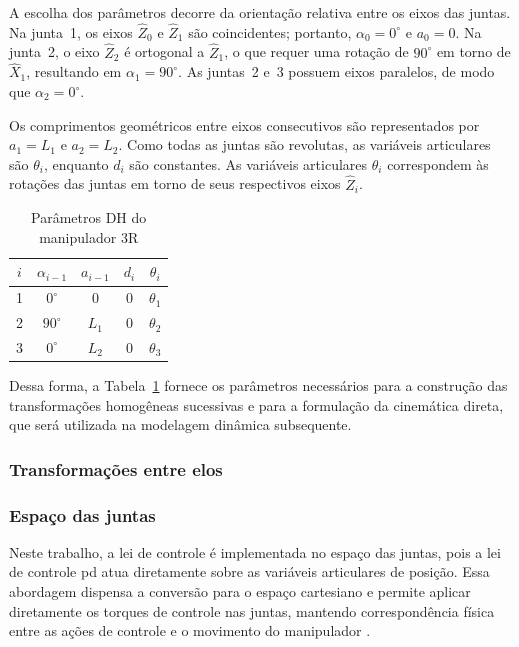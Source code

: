A escolha dos parâmetros decorre da orientação relativa entre os eixos das juntas.
Na junta~1, os eixos $\hat{Z}_0$ e $\hat{Z}_1$ são coincidentes; portanto, $\alpha_0 = 0^\circ$ e $a_0 = 0$.
Na junta~2, o eixo $\hat{Z}_2$ é ortogonal a $\hat{Z}_1$, o que requer uma rotação de $90^\circ$ em torno de $\hat{X}_1$, resultando em $\alpha_1 = 90^\circ$.
As juntas~2 e~3 possuem eixos paralelos, de modo que $\alpha_2 = 0^\circ$.

Os comprimentos geométricos entre eixos consecutivos são representados por $a_1=L_1$ e $a_2=L_2$.
Como todas as juntas são revolutas, as variáveis articulares são $\theta_i$, enquanto $d_i$ são constantes.
As variáveis articulares $\theta_i$ correspondem às rotações das juntas em torno de seus respectivos eixos $\hat{Z}_{i}$.

\begin{table}[ht]
\centering
\caption{Parâmetros DH do manipulador 3R}
\label{tab:dh_zxx}
\begin{tabular}{c|c|c|c|c}
$i$ & $\alpha_{i-1}$ & $a_{i-1}$ & $d_i$ & $\theta_i$ \\
\hline
1 & $0^\circ$  & 0 & 0 & $\theta_1$ \\
2 & $90^\circ$ & $L_1$ & 0 & $\theta_2$ \\
3 & $0^\circ$  & $L_2$ & 0 & $\theta_3$ \\
\end{tabular}
\end{table}

Dessa forma, a Tabela~\ref{tab:dh_zxx} fornece os parâmetros necessários para a construção das transformações homogêneas sucessivas e para a formulação da cinemática direta, que será utilizada na modelagem dinâmica subsequente.

\subsubsection{Transformações entre elos}
\label{sec:transformacoes_elos}



\subsubsection{Espaço das juntas}

Neste trabalho, a lei de controle é implementada no espaço das juntas, pois a lei de controle \gls{pd} atua diretamente sobre as variáveis articulares de posição.
Essa abordagem dispensa a conversão para o espaço cartesiano e permite aplicar diretamente os torques de controle nas juntas, mantendo correspondência física entre as ações de controle e o movimento do manipulador \cite{craig2005}.